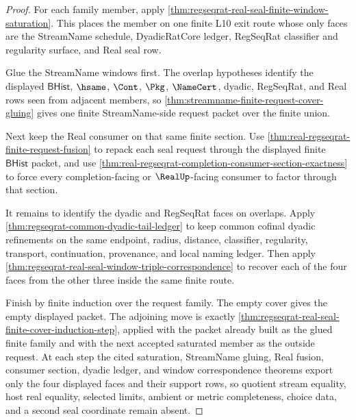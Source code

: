 \begin{proof}
For each family member, apply
\autoref{thm:regseqrat-real-seal-finite-window-saturation}. This places the
member on one finite L10 exit route whose only faces are the StreamName
schedule, DyadicRatCore ledger, RegSeqRat classifier and regularity surface,
and Real seal row.

Glue the StreamName windows first. The overlap hypotheses identify the
displayed $\mathsf{BHist}$, $\hsame$, $\Cont$, $\Pkg$, $\NameCert$, dyadic,
RegSeqRat, and Real rows seen from adjacent members, so
\autoref{thm:streamname-finite-request-cover-gluing} gives one finite
StreamName-side request packet over the finite union.

Next keep the Real consumer on that same finite section. Use
\autoref{thm:real-regseqrat-finite-request-fusion} to repack each seal request
through the displayed finite $\mathsf{BHist}$ packet, and use
\autoref{thm:real-regseqrat-completion-consumer-section-exactness} to force
every completion-facing or $\RealUp$-facing consumer to factor through that
section.

It remains to identify the dyadic and RegSeqRat faces on overlaps. Apply
\autoref{thm:regseqrat-common-dyadic-tail-ledger} to keep common cofinal
dyadic refinements on the same endpoint, radius, distance, classifier,
regularity, transport, continuation, provenance, and local naming ledger.
Then apply
\autoref{thm:regseqrat-real-seal-window-triple-correspondence} to recover each
of the four faces from the other three inside the same finite route.

Finish by finite induction over the request family. The empty cover gives the
empty displayed packet. The adjoining move is exactly
\autoref{thm:regseqrat-real-seal-finite-cover-induction-step}, applied with the
packet already built as the glued finite family and with the next accepted
saturated member as the outside request. At each step the cited saturation,
StreamName gluing, Real fusion, consumer section, dyadic ledger, and window
correspondence theorems export only the four displayed faces and their support
rows, so quotient stream equality, host real equality, selected limits, ambient
or metric completeness, choice data, and a second seal coordinate remain
absent.
\end{proof}

